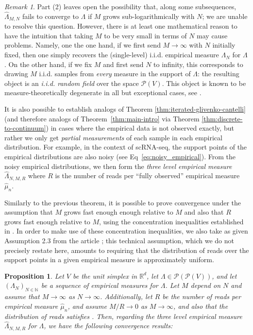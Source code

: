 \documentclass[aos, preprint]{imsart}
\theoremstyle{plain}
\newtheorem{prop}[theorem]{Proposition}
\theoremstyle{remark}
\newtheorem{rem}[example]{Remark}
\begin{document}
{\begin{rem}
Part (2) leaves open the possibility that, along some subsequences, $\hat{\Lambda}_{M,N}$ fails to converge to $\Lambda$ if $M$ grows sub-logarithmically with $N$; we are unable to resolve this question. However, there is at least one mathematical reason to have the intuition that taking $M$ to be very small in terms of $N$ may cause problems. Namely, one the one hand, if we first send $M\rightarrow\infty$ with $N$ initially fixed, then one simply recovers the (single-level) i.i.d. empirical measure $\Lambda_N$ for $\Lambda$. On the other hand, if we fix $M$ and first send $N$ to infinity, this corresponds to drawing $M$ i.i.d. samples from \emph{every} measure in the support of $\Lambda$: the resulting object is an \emph{i.i.d. random field} over the space $\mathcal{P}(V)$. This object is known to be measure-theoretically degenerate in all but exceptional cases, see \cite[Proposition 1.1]{sun1998almost}.

\end{rem}

It is also possible to establish analogs of Theorem \ref{thm:iterated-glivenko-cantelli} (and therefore analogs of Theorem~\ref{thm:main-intro} via Theorem \ref{thm:discrete-to-continuum}) in cases where the empirical data is not observed exactly, but rather we only get \emph{partial measurements} of each sample in each empirical distribution. For example, in the context of scRNA-seq, the support points of the empirical distributions are also noisy (see Eq~\eqref{eq:noisy_empirical}).
From the noisy empirical distributions,
we then form the \emph{three level empirical measure} $\hat{\Lambda}_{N,M,R}$
where $R$ is the number of reads per ``fully observed'' empirical measure $\hat\mu_n$.

Similarly to the previous theorem,
it is possible to prove  convergence under the assumption
that $M$ grows fast enough enough relative to $M$ and also that
$R$ grows fast enough relative to $M$, using the concentration inequalities
established in \cite{kim2024optimal}. In order to make use of these concentration inequalities, we also take as given Assumption 2.3 from the article  \cite{kim2024optimal}; this technical assumption, which we do not precisely restate here, amounts to requiring that the distribution of reads over the support points in a given empirical measure is approximately uniform.
\begin{prop}
\label{prop:finite-reads}
Let $V$ be the unit simplex in $\mathbb{R}^{d}$, let $\Lambda\in\mathcal{P}(\mathcal{P}(V))$,
and let $(\Lambda_{N})_{N\in\mathbb{N}}$ be a sequence of empirical
measures for $\Lambda$. Let $M$ depend on $N$ and assume that $M\rightarrow\infty$
as $N\rightarrow\infty$. Additionally, let $R$ be the number of
reads per empirical measure $\hat{\mu}_n$, and assume $M/R\rightarrow 0$ as $M\rightarrow\infty$, and also that the distribution of reads satisfies \cite[Assumption 2.3]{kim2024optimal}.
Then, regarding the three level empirical measure $\hat{\Lambda}_{N,M,R}$
for $\Lambda$, we have the following convergence results:
\begin{enumerate}


\end{enumerate}
\end{prop}}
\end{document}
